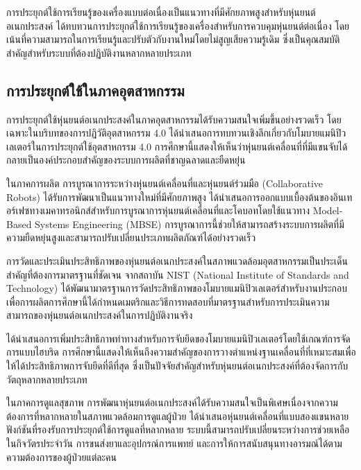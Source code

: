 \documentclass[a4paper]{article}
\begin{document}
การประยุกต์ใช้การเรียนรู้ของเครื่องแบบต่อเนื่องเป็นแนวทางที่มีศักยภาพสูงสำหรับหุ่นยนต์อเนกประสงค์ \textcite{thuruthel2021survey} ได้ทบทวนการประยุกต์ใช้การเรียนรู้ของเครื่องสำหรับการควบคุมหุ่นยนต์ต่อเนื่อง โดยเน้นที่ความสามารถในการเรียนรู้และปรับตัวกับงานใหม่โดยไม่สูญเสียความรู้เดิม ซึ่งเป็นคุณสมบัติสำคัญสำหรับระบบที่ต้องปฏิบัติงานหลากหลายประเภท

\subsection{การประยุกต์ใช้ในภาคอุตสาหกรรม}

การประยุกต์ใช้หุ่นยนต์อเนกประสงค์ในภาคอุตสาหกรรมได้รับความสนใจเพิ่มขึ้นอย่างรวดเร็ว โดยเฉพาะในบริบทของการปฏิวัติอุตสาหกรรม 4.0 \textcite{mohammadi2023mobile} ได้นำเสนอการทบทวนเชิงลึกเกี่ยวกับโมบายแมนิปิวเลเตอร์ในการประยุกต์ใช้อุตสาหกรรม 4.0 การศึกษานี้แสดงให้เห็นว่าหุ่นยนต์เคลื่อนที่ที่มีแขนจับได้กลายเป็นองค์ประกอบสำคัญของระบบการผลิตที่ชาญฉลาดและยืดหยุ่น

ในภาคการผลิต การบูรณาการระหว่างหุ่นยนต์เคลื่อนที่และหุ่นยนต์ร่วมมือ (Collaborative Robots) ได้รับการพัฒนาเป็นแนวทางใหม่ที่มีศักยภาพสูง \textcite{vitolo2022mobile} ได้นำเสนอการออกแบบเบื้องต้นของอินเทอร์เฟซทางเมคาทรอนิกส์สำหรับการบูรณาการหุ่นยนต์เคลื่อนที่และโคบอทโดยใช้แนวทาง Model-Based Systems Engineering (MBSE) การบูรณาการนี้ช่วยให้สามารถสร้างระบบการผลิตที่มีความยืดหยุ่นสูงและสามารถปรับเปลี่ยนประเภทผลิตภัณฑ์ได้อย่างรวดเร็ว

การวัดและประเมินประสิทธิภาพของหุ่นยนต์อเนกประสงค์ในสภาพแวดล้อมอุตสาหกรรมเป็นประเด็นสำคัญที่ต้องการมาตรฐานที่ชัดเจน \textcite{bostelman2016mobile} จากสถาบัน NIST (National Institute of Standards and Technology) ได้พัฒนามาตรฐานการวัดประสิทธิภาพของโมบายแมนิปิวเลเตอร์สำหรับงานประกอบเพื่อการผลิตการศึกษานี้ได้กำหนดเมตริกและวิธีการทดสอบที่มาตรฐานสำหรับการประเมินความสามารถของหุ่นยนต์อเนกประสงค์ในการปฏิบัติงานจริง

\textcite{xie2024pose} ได้นำเสนอการเพิ่มประสิทธิภาพท่าทางสำหรับการจับยึดของโมบายแมนิปิวเลเตอร์โดยใช้เกณฑ์การจัดการแบบไฮบริด การศึกษานี้แสดงให้เห็นถึงความสำคัญของการวางตำแหน่งฐานเคลื่อนที่ที่เหมาะสมเพื่อให้ได้ประสิทธิภาพการจับยึดที่ดีที่สุด ซึ่งเป็นปัจจัยสำคัญสำหรับหุ่นยนต์อเนกประสงค์ที่ต้องจัดการกับวัตถุหลากหลายประเภท

ในภาคการดูแลสุขภาพ การพัฒนาหุ่นยนต์อเนกประสงค์ได้รับความสนใจเป็นพิเศษเนื่องจากความต้องการที่หลากหลายในสภาพแวดล้อมการดูแลผู้ป่วย \textcite{stueckler2023hollie} ได้นำเสนอหุ่นยนต์เคลื่อนที่แบบสองแขนหลายฟังก์ชันที่รองรับการประยุกต์ใช้การดูแลที่หลากหลาย ระบบนี้สามารถปรับเปลี่ยนระหว่างการช่วยเหลือในกิจวัตรประจำวัน การขนส่งยาและอุปกรณ์การแพทย์ และการให้การสนับสนุนทางอารมณ์ได้ตามความต้องการของผู้ป่วยแต่ละคน
\end{document}
